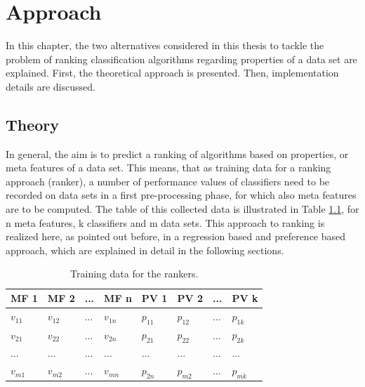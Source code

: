 %
\chapter{Approach}
\label{sec:approach}

In this chapter, the two alternatives considered in this thesis to tackle the problem of ranking classification algorithms regarding properties of a data set are explained. First, the theoretical approach is presented. Then, implementation details are discussed.

\section{Theory}

In general, the aim is to predict a ranking of algorithms based on properties, or meta features of a data set. This means, that as training data for a ranking approach (ranker), a number of performance values of classifiers need to be recorded on data sets in a first pre-processing phase, for which also meta features are to be computed. The table of this collected data is illustrated in Table \ref{tab:performanceValues}, for n meta features, k classifiers and m data sets. This approach to ranking is realized here, as pointed out before, in a regression based and preference based approach, which are explained in detail in the following sections.

\begin{table}[h]
\centering
	\begin{tabularx}{\textwidth}{X | X | X | X | X | X | X | X}
		MF 1			& MF 2		& ... 	& MF n		& PV 1 		& PV 2 		&	...	&	PV k 		\\ \hline
		$v_{11}$		& $v_{12}$	& ...	& $v_{1n}$	& $p_{11}$	& $p_{12}$	& 	...	&	$p_{1k}$		\\ 
		$v_{21}$		& $v_{22}$	& ...	& $v_{2n}$	& $p_{21}$	& $p_{22}$	& 	...	&	$p_{2k}$		\\ 
		...			& ...		& ...	& ...		& ...		& ...		&	...	&	...			\\ 
		$v_{m1}$		& $v_{m2}$	& ... 	& $v_{mn}$	& $p_{2n}$	& $p_{m2}$	& 	...	&	$p_{mk}$			 
	\end{tabularx}
	\caption{Training data for the rankers.}
	\label{tab:performanceValues}
\end{table}

